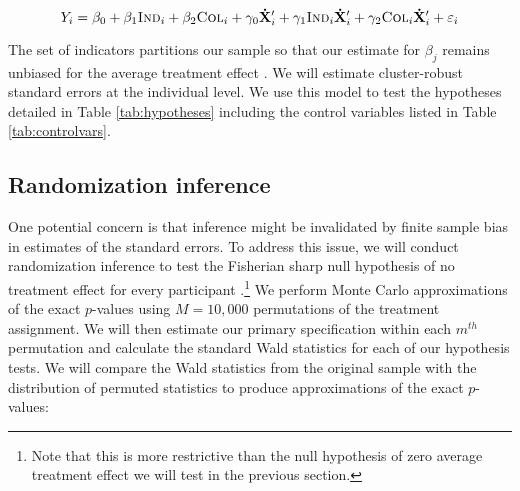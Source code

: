 \documentclass[11pt, a4paper]{article}\usepackage[]{graphicx}\usepackage[]{color}
\begin{document}
        \begin{equation} \label{eq:controls}
            Y_{i} = \beta_{0} + \beta_{1}\text{\textsc{Ind}}_{i} + \beta_{2}\text{\textsc{Col}}_{i} + \gamma_{0} \mathbf{\dot X}'_i + \gamma_{1}\text{\textsc{Ind}}_{i} \mathbf{\dot X}'_i + \gamma_{2}\text{\textsc{Col}}_{i} \mathbf{\dot X}'_i + \varepsilon_{i}
        \end{equation}

        The set of indicators partitions our sample so that our estimate for $\beta_j$ remains unbiased for the average treatment effect \parencite{lin_agnostic_2013}. We will estimate cluster-robust standard errors at the individual level. We use this model to test the hypotheses detailed in Table \ref{tab:hypotheses} including the control variables listed in Table \ref{tab:controlvars}.

        \begin{table}[h]
        \centering
        \caption{Control variables for covariate adjustment}
        \label{tab:controlvars}
        \end{table}

    \subsection{Randomization inference} %

        One potential concern is that inference might be invalidated by finite sample bias in estimates of the standard errors. To address this issue, we will conduct randomization inference to test the Fisherian sharp null hypothesis of no treatment effect for every participant \parencite{fisher_design_1935}.\footnote{Note that this is more restrictive than the null hypothesis of zero average treatment effect we will test in the previous section.} We perform Monte Carlo approximations of the exact $p$-values using $M=10,000$ permutations of the treatment assignment. We will then estimate our primary specification within each $m^{th}$ permutation and calculate the standard Wald statistics for each of our hypothesis tests. We will compare the Wald statistics from the original sample with the distribution of permuted statistics to produce approximations of the exact $p$-values:
\end{document}
